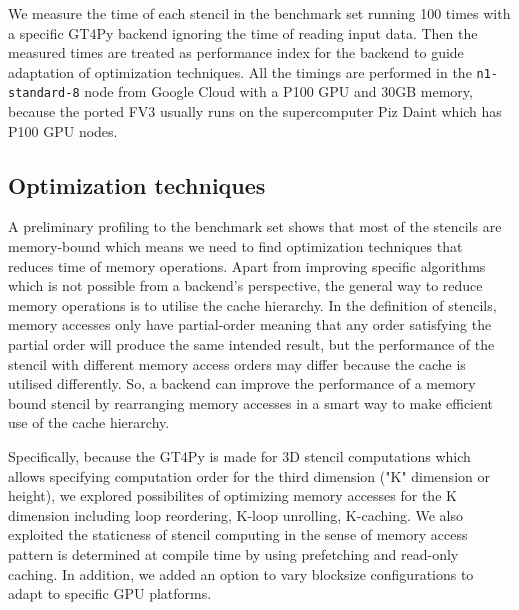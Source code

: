 \documentclass[]{article}
\begin{document}
We measure the time of each stencil in the benchmark set running 100 times with a specific GT4Py backend ignoring the time of reading input data. Then the measured times are treated as performance index for the backend to guide adaptation of optimization techniques. All the timings are performed in the \texttt{n1-standard-8} node from Google Cloud with a P100 GPU and 30GB memory, because the ported FV3 usually runs on the supercomputer Piz Daint which has P100 GPU nodes.

\subsection{Optimization techniques}
A preliminary profiling to the benchmark set shows that most of the stencils are memory-bound which means we need to find optimization techniques that reduces time of memory operations. Apart from improving specific algorithms which is not possible from a backend's perspective, the general way to reduce memory operations is to utilise the cache hierarchy.
In the definition of stencils, memory accesses only have partial-order meaning that any order satisfying the partial order will produce the same intended result, but the performance of the stencil with different memory access orders may differ because the cache is utilised differently. So, a backend can improve the performance of a memory bound stencil by rearranging memory accesses in a smart way to make efficient use of the cache hierarchy.

Specifically, because the GT4Py is made for 3D stencil computations which allows specifying computation order for the third dimension ("K" dimension or height), we explored possibilites of optimizing memory accesses for the K dimension including loop reordering, K-loop unrolling, K-caching. We also exploited the staticness of stencil computing in the sense of memory access pattern is determined at compile time by using prefetching and read-only caching. In addition, we added an option to vary blocksize configurations to adapt to specific GPU platforms.
\end{document}
